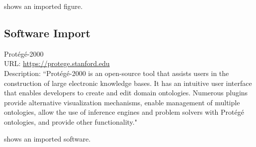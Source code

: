  shows an imported figure.

\subsection{Software Import}


\begin{software}
Prot{\'{e}}g{\'{e}}-2000~\cite{DBLP:conf/amia/NoyCFKTVM03}\\
URL: \url{https://protege.stanford.edu}\\
Description: ``Prot\'{e}g\'{e}-2000 is an open-source tool that assists users in the construction of large electronic knowledge bases. It has an intuitive user interface that enables developers to create and edit domain ontologies. Numerous plugins provide alternative visualization mechanisms, enable management of multiple ontologies, allow the use of inference engines and problem solvers with Prot\'{e}g\'{e} ontologies, and provide other functionality."~\cite{DBLP:conf/amia/NoyCFKTVM03}
\label{software:protege}
\end{software}

 shows an imported software.


